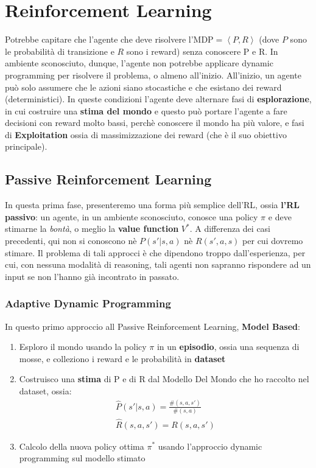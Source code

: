 \section{Reinforcement Learning}
Potrebbe capitare che l'agente che deve risolvere l'MDP$ = \left<P,R\right>$ (dove $P$ sono le probabilità di transizione e $R$ sono i reward)
senza conoscere P e R. In ambiente sconosciuto, dunque, l'agente non potrebbe applicare dynamic programming per risolvere il problema, o almeno all'inizio.
All'inizio, un agente può solo assumere che le azioni siano stocastiche e che esistano dei reward (deterministici). In queste
condizioni l'agente deve alternare fasi di \textbf{esplorazione}, in cui costruire una \textbf{stima del mondo} e questo può portare
l'agente a fare decisioni con reward molto bassi, perchè conoscere il mondo ha più valore, e fasi di \textbf{Exploitation} ossia di 
massimizzazione dei reward (che è il suo obiettivo principale).

\subsection{Passive Reinforcement Learning}
In questa prima fase, presenteremo una forma più semplice dell'RL, ossia \textbf{l'RL passivo}: un agente, in un ambiente sconosciuto,
conosce una policy $\pi$ e deve stimarne la \textit{bontà}, o meglio la \textbf{value function} $V^*$. A differenza dei casi precedenti,
qui non si conoscono nè $P(s'|s,a)$ nè $R(s',a,s)$ per cui dovremo stimare. Il problema di tali approcci è che dipendono troppo dall'esperienza,
per cui, con nessuna modalità di reasoning, tali agenti non sapranno rispondere ad un input se non l'hanno già incontrato in passato.

\subsubsection{Adaptive Dynamic Programming}
In questo primo approccio all Passive Reinforcement Learning, \textbf{Model Based}:
\begin{enumerate}
    \item Esploro il mondo usando la policy $\pi$ in un \textbf{episodio}, ossia una sequenza di mosse, e colleziono i reward e le probabilità in \textbf{dataset}
    \item Costruisco una \textbf{stima} di P e di R dal Modello Del Mondo che ho raccolto nel dataset, ossia:
    \begin{gather}
        \widehat{P}(s'|s,a) = \frac{\#(s,a,s')}{\#(s,a)} \\
        \widehat{R}(s,a,s') = R(s,a,s') 
    \end{gather}
    \item Calcolo della nuova policy ottima $\pi^*$ usando l'approccio dynamic programming sul modello stimato
\end{enumerate}

